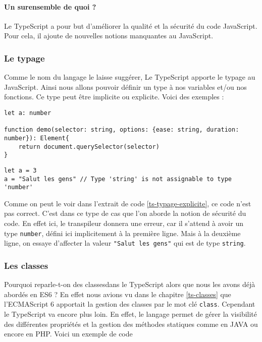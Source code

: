 \paragraph{Un surensemble de quoi ?}
Le TypeScript a pour but d'améliorer la qualité et la sécurité du code JavaScript. Pour cela, il ajoute de nouvelles notions manquantes au JavaScript. 

\subsubsection{Le typage}
Comme le nom du langage le laisse suggérer, Le TypeScript apporte le typage au JavaScript\cite{grafikart:TypeScript}. Ainsi nous allons pouvoir définir un type à nos variables et/ou nos fonctions. Ce type peut être implicite ou explicite. Voici des exemples :

\begin{lstlisting}[style=htmlcssjs, caption={Typage explicite}]
let a: number

function demo(selector: string, options: {ease: string, duration: number}): Element{
    return document.querySelector(selector)
}
\end{lstlisting}

\begin{lstlisting}[style=htmlcssjs, caption={Typage implicite}, label={ts-typage-explicite}]
let a = 3
a = "Salut les gens" // Type 'string' is not assignable to type 'number'
\end{lstlisting}
Comme on peut le voir dans l'extrait de code \ref{ts-typage-explicite}, ce code n'est pas correct. C'est dans ce type de cas que l'on aborde la notion de sécurité du code. En effet ici, le transpileur donnera une erreur, car il s'attend à avoir un type \texttt{number}, défini ici implicitement à la première ligne. Mais à la deuxième ligne, on essaye d'affecter la valeur \texttt{"Salut les gens"} qui est de type \texttt{string}.



\subsubsection{Les classes}
Pourquoi reparle-t-on des classesdans le TypeScript alors que nous les avons déjà abordés en ES6 ? En effet nous avions vu dans le chapitre \ref{ts-classes} que l'ECMAScript 6 apportait la gestion des classes par le mot clé \texttt{class}. Cependant le TypeScript va encore plus loin. En effet, le langage permet de gérer la visibilité des différentes propriétés et la gestion des méthodes statiques comme en JAVA ou encore en PHP. Voici un exemple de code \cite{grafikart:TypeScript}

